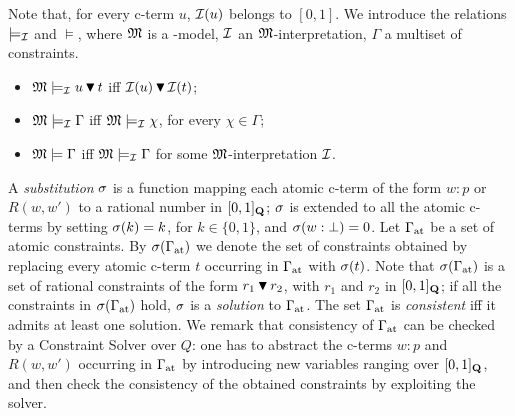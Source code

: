 Note that, for every c-term $u$, $\mathcal{I}(u)$ belongs to $[0,1]$.
 We introduce the relations
$\models_{\mathcal{I}}$ and $\models$, where $\mathfrak{M}$ is a \GWM-model, $\mathcal{I}$ an
$\mathfrak{M}$-interpretation, $\Gamma$ a multiset of constraints.
\begin{itemize}
\item $\mathfrak{M}\models_{\mathcal{I}} u \,\blacktriangledown\, t$ iff   $\mathcal{I}(u)  \,\blacktriangledown\, \mathcal{I}(t)$;
  
\item $\mathfrak{M}\models_{\mathcal{I}} \Gamma$ iff $\mathfrak{M}\models_{\mathcal{I}}\chi$, for every
  $\chi\in\Gamma$;

\item $\mathfrak{M}\models \Gamma$ iff $\mathfrak{M}\models_{\mathcal{I}} \Gamma$ for some
  $\mathfrak{M}$-interpretation $\mathcal{I}$.
\end{itemize}
A \emph{substitution} $\sigma$ is a function mapping each atomic c-term of
the form $w : p$ or $R(w,w')$ to a rational number in $[0,1]_{\mathbf{Q}}$; $\sigma$
is extended to all the atomic c-terms by setting $\sigma(k)=k$, for
$k\in\{0,1\}$, and $\sigma(w:\bot)=0$.  Let $\Gamma_\mathrm{at}$ be a set of atomic
constraints.  By $\sigma(\Gamma_\mathrm{at})$ we denote the set of constraints obtained
by replacing every atomic c-term $t$ occurring in $\Gamma_\mathrm{at}$ with $\sigma(t)$.
Note that $\sigma(\Gamma_\mathrm{at})$ is a set of rational constraints of the form $r_1
\,\blacktriangledown\, r_2$, with $r_1$ and $r_2$ in $[0,1]_{\mathbf{Q}}$; if all the
constraints in $\sigma(\Gamma_\mathrm{at})$ hold, $\sigma$ is a \emph{solution} to $\Gamma_\mathrm{at}$.
The set $\Gamma_\mathrm{at}$ is \emph{consistent} iff it admits at least one
solution.  We remark that consistency of $\Gamma_\mathrm{at}$ can be checked by a
Constraint Solver over $Q$: one has to abstract the c-terms $w : p$
and $R(w,w')$ occurring in $\Gamma_\mathrm{at}$ by introducing new variables ranging
over $[0,1]_{\mathbf{Q}}$, and then check the consistency of the obtained
constraints by exploiting the solver.


